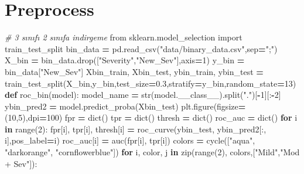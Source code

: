 \documentclass[12pt,twoside]{deuthesis}
\newenvironment{Shaded}{\begin{snugshade}}{\end{snugshade}}
\newcommand{\BuiltInTok}[1]{#1}
\newcommand{\CommentTok}[1]{\textcolor[rgb]{0.56,0.35,0.01}{\textit{#1}}}
\newcommand{\ControlFlowTok}[1]{\textcolor[rgb]{0.13,0.29,0.53}{\textbf{#1}}}
\newcommand{\DecValTok}[1]{\textcolor[rgb]{0.00,0.00,0.81}{#1}}
\newcommand{\FloatTok}[1]{\textcolor[rgb]{0.00,0.00,0.81}{#1}}
\newcommand{\ImportTok}[1]{#1}
\newcommand{\KeywordTok}[1]{\textcolor[rgb]{0.13,0.29,0.53}{\textbf{#1}}}
\newcommand{\NormalTok}[1]{#1}
\newcommand{\OperatorTok}[1]{\textcolor[rgb]{0.81,0.36,0.00}{\textbf{#1}}}
\newcommand{\StringTok}[1]{\textcolor[rgb]{0.31,0.60,0.02}{#1}}
\begin{document}
\hypertarget{preprocess}{%
\section{Preprocess}\label{preprocess}}
\begin{Shaded}
\begin{Highlighting}[]
\CommentTok{\# 3 sınıfı 2 sınıfa indirgeme}
\ImportTok{from}\NormalTok{ sklearn.model\_selection }\ImportTok{import}\NormalTok{ train\_test\_split}
\NormalTok{bin\_data }\OperatorTok{=}\NormalTok{ pd.read\_csv(}\StringTok{"data/binary\_data.csv"}\NormalTok{,sep}\OperatorTok{=}\StringTok{";"}\NormalTok{)}
\NormalTok{X\_bin }\OperatorTok{=}\NormalTok{ bin\_data.drop([}\StringTok{"Severity"}\NormalTok{,}\StringTok{"New\_Sev"}\NormalTok{],axis}\OperatorTok{=}\DecValTok{1}\NormalTok{)}
\NormalTok{y\_bin }\OperatorTok{=}\NormalTok{ bin\_data[}\StringTok{"New\_Sev"}\NormalTok{]}
\NormalTok{Xbin\_train, Xbin\_test, ybin\_train, ybin\_test }\OperatorTok{=}\NormalTok{ train\_test\_split(X\_bin,y\_bin,test\_size}\OperatorTok{=}\FloatTok{0.3}\NormalTok{,stratify}\OperatorTok{=}\NormalTok{y\_bin,random\_state}\OperatorTok{=}\DecValTok{13}\NormalTok{)}
\KeywordTok{def}\NormalTok{ roc\_bin(model):}
\NormalTok{    model\_name }\OperatorTok{=} \BuiltInTok{str}\NormalTok{(model.\_\_class\_\_).split(}\StringTok{"."}\NormalTok{)[}\OperatorTok{{-}}\DecValTok{1}\NormalTok{][:}\OperatorTok{{-}}\DecValTok{2}\NormalTok{]}
\NormalTok{    ybin\_pred2 }\OperatorTok{=}\NormalTok{ model.predict\_proba(Xbin\_test)}
\NormalTok{    plt.figure(figsize}\OperatorTok{=}\NormalTok{(}\DecValTok{10}\NormalTok{,}\DecValTok{5}\NormalTok{),dpi}\OperatorTok{=}\DecValTok{100}\NormalTok{)}
\NormalTok{    fpr }\OperatorTok{=} \BuiltInTok{dict}\NormalTok{()}
\NormalTok{    tpr }\OperatorTok{=} \BuiltInTok{dict}\NormalTok{()}
\NormalTok{    thresh }\OperatorTok{=} \BuiltInTok{dict}\NormalTok{()}
\NormalTok{    roc\_auc }\OperatorTok{=} \BuiltInTok{dict}\NormalTok{()}
    \ControlFlowTok{for}\NormalTok{ i }\KeywordTok{in} \BuiltInTok{range}\NormalTok{(}\DecValTok{2}\NormalTok{):}
\NormalTok{        fpr[i], tpr[i], thresh[i] }\OperatorTok{=}\NormalTok{ roc\_curve(ybin\_test, ybin\_pred2[:, i],pos\_label}\OperatorTok{=}\NormalTok{i)}
\NormalTok{        roc\_auc[i] }\OperatorTok{=}\NormalTok{ auc(fpr[i], tpr[i])}
\NormalTok{    colors }\OperatorTok{=}\NormalTok{ cycle([}\StringTok{"aqua"}\NormalTok{, }\StringTok{"darkorange"}\NormalTok{, }\StringTok{"cornflowerblue"}\NormalTok{])}
    \ControlFlowTok{for}\NormalTok{ i, color, j }\KeywordTok{in} \BuiltInTok{zip}\NormalTok{(}\BuiltInTok{range}\NormalTok{(}\DecValTok{2}\NormalTok{), colors,[}\StringTok{"Mild"}\NormalTok{,}\StringTok{"Mod + Sev"}\NormalTok{]):}

\end{Highlighting}
\end{Shaded}
\end{document}
